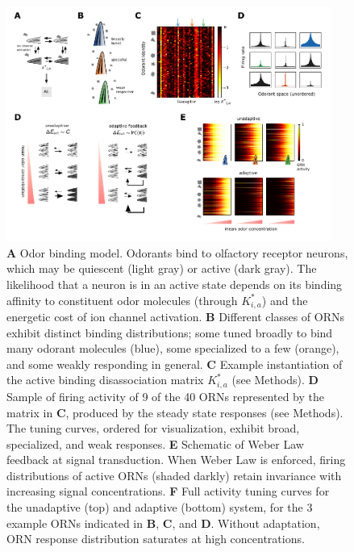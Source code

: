 \begin{figure}
\includegraphics[width=0.95\textwidth]{figures/Figures_tuning_curve}
\caption{\textbf{A} Odor binding model. Odorants bind to olfactory receptor neurons, which may be quiescent (light gray) or active (dark gray). The likelihood that a neuron is in an active state depends on its binding affinity to constituent odor molecules (through $K^*_{i, a}$) and the energetic cost of ion channel activation. \textbf{B} Different classes of ORNs exhibit distinct binding distributions; some tuned broadly to bind many odorant molecules (blue), some specialized to a few (orange), and some weakly responding in general. \textbf{C} Example instantiation of the active binding disassociation matrix $K^*_{i, a}$ (see Methods). \textbf{D} Sample of firing activity of 9 of the 40 ORNs represented by the matrix in \textbf{C}, produced by the steady state responses (see Methods). The tuning curves, ordered for visualization, exhibit broad, specialized, and weak responses. \textbf{E} Schematic of Weber Law feedback at signal transduction. When Weber Law is enforced, firing distributions of active ORNs (shaded darkly) retain invariance with increasing signal concentrations. \textbf{F} Full activity tuning curves for the unadaptive (top) and adaptive (bottom) system, for the 3 example ORNs indicated in \textbf{B}, \textbf{C}, and \textbf{D}. Without adaptation, ORN response distribution saturates at high concentrations.}
\label{fig:tuning_curves}
\end{figure}

